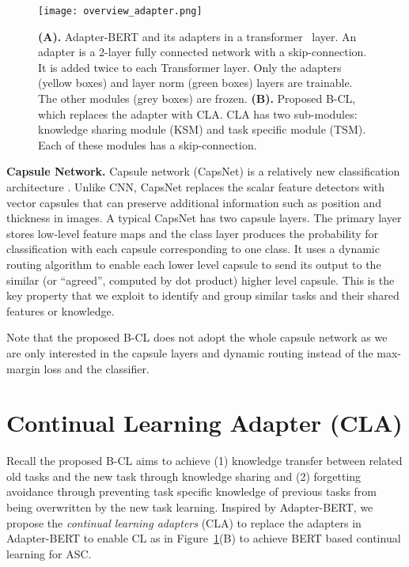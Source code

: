 \documentclass[11pt]{article}
\begin{document}
\begin{figure}[t]
\centering
\texttt{[image: overview\_adapter.png]}
\caption{
\textbf{(A).} Adapter-BERT \cite{DBLP:conf/icml/HoulsbyGJMLGAG19} and its adapters in a transformer~\cite{vaswani2017attention} layer. An adapter is a 2-layer fully connected network with a skip-connection. {\color{black}It is added twice to each Transformer layer. 
Only the adapters (yellow boxes) and layer norm (green boxes) layers are trainable. The other modules (grey boxes) are frozen.}
\textbf{(B).} Proposed B-CL, which replaces the adapter with CLA. CLA has two sub-modules: knowledge sharing module (KSM) and task specific module (TSM). Each of these modules has a skip-connection. 
}
\label{overview_adapter}
\vspace{-2mm}
\end{figure}


\textbf{Capsule Network.}
Capsule network (CapsNet) is a relatively new classification architecture  \cite{hinton2011transforming,sabour2017dynamic}. Unlike CNN, CapsNet replaces the scalar feature detectors with vector capsules that can preserve additional information such as position and thickness in images. A typical CapsNet has two capsule layers. The primary layer stores low-level feature maps and the class layer produces the probability for classification with each capsule corresponding to one class. 
{\color{black}It uses a dynamic routing algorithm to enable each lower level capsule to send its output to the similar (or ``agreed'', {\color{black}computed by dot product) } higher level capsule.} This is the key property that we exploit to identify and group similar tasks and their shared features or knowledge.





Note that the proposed B-CL does not adopt the whole capsule network as we are only interested in the capsule layers and dynamic routing instead of the max-margin loss and the classifier. 



\section{Continual Learning Adapter (CLA)}
\vspace{-1mm}


Recall the proposed B-CL aims to achieve (1) knowledge transfer between related old tasks and the new task through knowledge sharing and (2) forgetting avoidance through preventing task specific knowledge of previous tasks from being overwritten by the new task learning. Inspired by Adapter-BERT, we propose the \textit{continual learning adapters} (CLA) to replace the adapters in Adapter-BERT to enable CL as in Figure~\ref{overview_adapter}(B) to achieve BERT based continual learning for ASC. 
\end{document}
